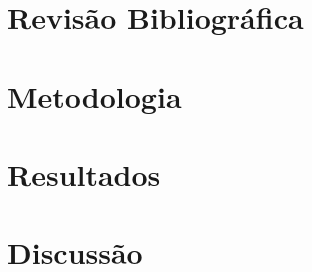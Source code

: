 \section{Revisão Bibliográfica}


\section{Metodologia}


\section{Resultados}


\section{Discussão}

